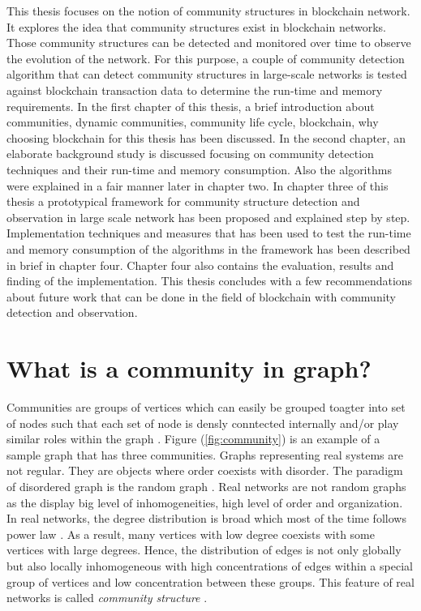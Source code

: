 This thesis focuses on the notion of community structures in blockchain network. It explores the idea that community structures exist in blockchain networks. Those community structures can be detected and monitored over time to observe the evolution of the network. For this purpose, a couple of community detection algorithm that can detect community structures in large-scale networks is tested against blockchain transaction data to determine the run-time and memory requirements. In the first chapter of this thesis, a brief introduction about communities, dynamic communities, community life cycle, blockchain, why choosing blockchain for this thesis has been discussed. In the second chapter, an elaborate background study is discussed focusing on community detection techniques and their run-time and memory consumption. Also the algorithms were explained in a fair manner later in chapter two. In chapter three of this thesis a prototypical framework for community structure detection and observation in large scale network has been proposed and explained step by step. Implementation techniques and measures that has been used to test the run-time and memory consumption of the algorithms in the framework has been described in brief in chapter four. Chapter four also contains the evaluation, results and finding of the implementation. This thesis concludes with a few recommendations about future work that can be done in the field of blockchain with community detection and observation.

\section{What is a community in graph?}\label{community_in_graph}
Communities are groups of vertices which can easily be grouped toagter into set of nodes such that each set of node is densly conntected internally and/or play similar roles within the graph \cite{ref-6}. Figure (\ref{fig:community}) is an example of a sample graph that has three communities. Graphs representing real systems are not regular. They are objects where order coexists with disorder. The paradigm of disordered graph is the random graph \cite{ref-21}. Real networks are not random  graphs as the display big level of inhomogeneities, high level of order and organization. In real networks, the degree distribution is broad which most of the time follows power law \cite{ref-6}. As a result, many vertices with low degree coexists with some vertices with large degrees. Hence, the distribution of edges is not only globally but also locally inhomogeneous with high concentrations of edges within a special group of vertices and low concentration between these groups. This feature of real networks is called \textit{community structure} \cite{ref-1}.


